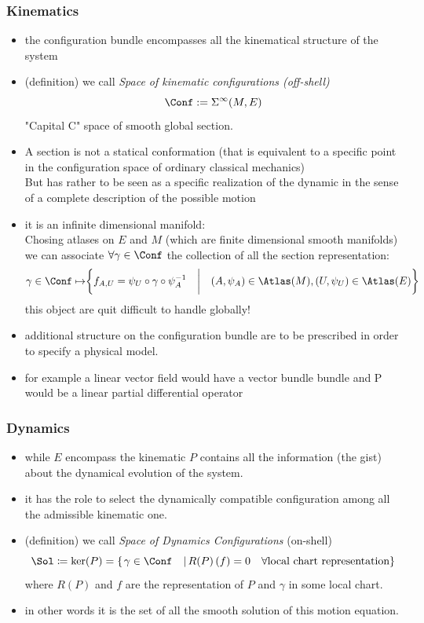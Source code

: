 \documentclass[a4paper,11pt]{scrartcl}
\begin{document}
	\subsubsection*{Kinematics}
	\begin{itemize}
		\item the configuration bundle encompasses all the kinematical structure of the system
		\item (definition) we call \emph{Space of kinematic configurations (off-shell)}
		$$ \Conf := \Sigma^\infty(M,E)$$
		"Capital C"  space of smooth global section.
		\item A section is not a statical conformation (that is equivalent to a specific point in the configuration space of ordinary classical mechanics) \\
		But has rather to be seen as a specific realization of the dynamic in the sense of a complete description of the possible motion
		\item it is an infinite dimensional manifold:\\
		Chosing atlases on $E$ and $M$ (which are finite dimensional smooth manifolds) we can associate $\forall \gamma \in \Conf$ the collection of all the section representation:
		$$ \gamma \in \Conf \mapsto \biggr\{f_{A,U}=\psi_U \circ \gamma \circ \psi_A^{-1} \quad \biggr\vert \quad (A,\psi_A) \in \Atlas(M), (U,\psi_U)\in \Atlas(E)   \biggr\} $$
		this object are quit difficult to handle globally!
		\item additional structure on the configuration bundle are to be prescribed in order to specify a physical model.
		\item for example a linear vector field would have a vector bundle bundle and P would be a linear partial differential operator
	\end{itemize}
	\subsubsection*{Dynamics}
	\begin{itemize}
		\item while $E$ encompass the kinematic $P$ contains all the information (the gist) about the dynamical evolution of the system.
		\item it has the role to select the dynamically compatible configuration among all the admissible kinematic one.
		\item (definition) we call \emph{Space of Dynamics Configurations} (on-shell)
		$$ 			\Sol \coloneqq \ker(P) = \left\{\left. \gamma \in \Conf \quad\right\vert  R(P)\left(f\right) = 0 \quad \forall \textrm{local chart representation}\right\}$$
		where $R(P)$ and $f$ are the representation of $P$ and $\gamma$ in some local chart.
		\item in other words it is the set of all the smooth solution of this motion equation.
	\end{itemize}
\end{document}
